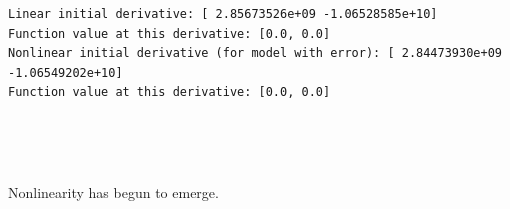 \documentclass[11pt]{article}
\begin{document}
    \begin{Verbatim}[commandchars=\\\{\}]
Linear initial derivative: [ 2.85673526e+09 -1.06528585e+10]
Function value at this derivative: [0.0, 0.0]
Nonlinear initial derivative (for model with error): [ 2.84473930e+09
-1.06549202e+10]
Function value at this derivative: [0.0, 0.0]
    \end{Verbatim}

    \begin{center}
    \end{center}
    { \hspace*{\fill} \\}
    
    \begin{center}
    \end{center}
    { \hspace*{\fill} \\}
    
    Nonlinearity has begun to emerge.
\end{document}
